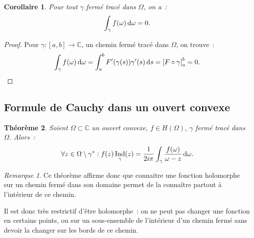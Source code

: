 \documentclass{report}
\newtheorem{thm}{Théorème}[chapter]
\newtheorem{cor}[thm]{Corollaire}
\theoremstyle{definition}
\theoremstyle{remark}
\newtheorem*{rmq}{Remarque}
\numberwithin{equation}{section}
\newcommand{\C}{\mathbb C}
\DeclareMathOperator{\Ind}{Ind}
\begin{document}
			\begin{cor} Pour tout $\gamma$ fermé tracé dans $\Omega$, on a~:
			\begin{equation}
				\int_\gamma f(\omega)\dif \omega = 0.
			\end{equation}
			\end{cor}

			\begin{proof} Pour $\gamma : [a, b] \to \C$, un chemin fermé tracé dans $\Omega$, on trouve~:
			\begin{equation}
				\int_\gamma f(\omega)\dif \omega = \int_a^bF'(\gamma(s))\gamma'(s)\dif s = \left[F \circ \gamma\right]_a^b = 0.
			\end{equation}
			\end{proof}

		\subsection{Formule de Cauchy dans un ouvert convexe}
			\begin{thm} Soient $\Omega \subset \C$ un ouvert convexe, $f \in H(\Omega)$, $\gamma$ fermé tracé dans $\Omega$. Alors~:
			\begin{equation}
				\forall z \in \Omega \setminus \gamma^* : f(z)\Ind_\gamma(z) = \frac 1{2i\pi}\int_\gamma\frac {f(\omega)}{\omega - z}\dif \omega.
			\end{equation}
			\end{thm}

			\begin{rmq} Ce théorème affirme donc que connaitre une fonction holomorphe sur un chemin fermé dans son domaine permet de la connaître partout à
			l'intérieur de ce chemin.

			Il est donc très restrictif d'être holomorphe~: on ne peut pas changer une fonction en certains points, ou sur un sous-ensemble de l'intérieur d'un
			chemin fermé sans devoir la changer sur les bords de ce chemin.
			\end{rmq}
\end{document}
